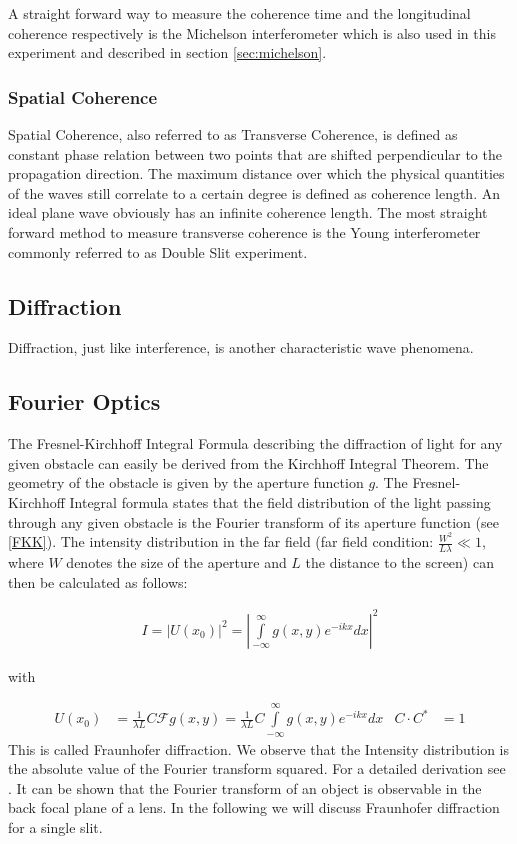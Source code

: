 A straight forward way to measure the coherence time and the longitudinal coherence respectively is the Michelson interferometer which is also used in this experiment and described in section \ref{sec:michelson}.
\subsubsection{Spatial Coherence}
Spatial Coherence, also referred to as Transverse Coherence, is defined as constant phase relation between two points that are shifted perpendicular to the propagation direction. The maximum distance over which the physical quantities of the waves still correlate to a certain degree is defined as coherence length. An ideal plane wave obviously has an infinite coherence length. The most straight forward method to measure transverse coherence is the Young interferometer commonly referred to as Double Slit experiment.

\subsection{Diffraction}

Diffraction, just like interference, is another characteristic wave phenomena.

\subsection{Fourier Optics}

The Fresnel-Kirchhoff Integral Formula describing the diffraction of light for any given obstacle can easily be derived from the Kirchhoff Integral Theorem. The geometry of the obstacle is given by the aperture function $g$. The Fresnel-Kirchhoff Integral formula states that the field distribution of the light passing through any given obstacle is the Fourier transform of its aperture function (see \ref{FKK}). The intensity distribution in the far field (far field condition: $\frac{W^2}{L\lambda} \ll 1$, where $W$ denotes the size of the aperture and $L$ the distance to the screen) can then be calculated as follows:


\begin{align}
I=|U(x_0)|^2=\left| \int\limits_{-\infty}^{\infty} g(x,y)e^{-ikx}dx \right|^2
\end{align}

with 

\begin{align}
  U(x_0) &= \frac{1}{\lambda L} C \mathscr{F}{g(x, y)}    = \frac{1}{\lambda L} C   \int\limits_{-\infty}^{\infty}  g(x,y)e^{-ikx}dx    &  C  \cdot C^* &= 1                         \label{FKK}
\end{align}
This is called Fraunhofer diffraction. We observe that the Intensity distribution is the absolute value of the Fourier transform squared. For a detailed derivation see \cite{demtroeder2}. It can be shown that the Fourier transform of an object is observable in the back focal plane of a lens. \cite{demtroeder2}
In the following we will discuss Fraunhofer diffraction for a single slit.

